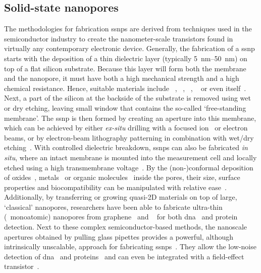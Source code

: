 \subsection{Solid-state nanopores}
%

The methodologies for fabrication \glspl{ssnp} are derived from techniques used in the semiconductor industry
to create the nanometer-scale transistors found in virtually any contemporary electronic device. Generally,
the fabrication of a \gls{ssnp} starts with the deposition of a thin dielectric layer (typically
\SIrange{5}{50}{\nm}) on top of a flat silicon substrate. Because this layer will form both the membrane and
the nanopore, it must have both a high mechanical strength and a high chemical resistance. Hence, suitable
materials include ~\cite{Li-2001,Storm-2003}, ~\cite{Storm-2005},
~\cite{Venkatesan-2009}, ~\cite{Larkin-2013} or even 
itself~\cite{Malachowski-2013}. Next, a part of the silicon at the backside of the substrate is removed using
wet or dry etching, leaving small window that contains the so-called `free-standing membrane'. The \gls{ssnp}
is then formed by creating an aperture into this membrane, which can be achieved by either \textit{ex-situ}
drilling with a focused ion~\cite{Li-2001} or electron~\cite{Storm-2003} beams, or by electron-beam
lithography patterning in combination with wet/dry etching~\cite{Nam-2009}. With controlled dielectric
breakdown, \glspl{ssnp} can also be fabricated \textit{in situ}, where an intact membrane is mounted into the
measurement cell and locally etched using a high transmembrane voltage~\cite{Kwok-2014}. By the
(non-)conformal deposition of oxides~\cite{Chen-2004}, metals~\cite{Li-2013d,Auger-2014,Spitzberg-2019} or
organic molecules~\cite{Wanunu-2007,Yusko-2011,Wei-2012,Rotem-2012} inside the pores, their size, surface
properties and biocompatibility can be manipulated with relative ease~\cite{Eggenberger-2019}. Additionally,
by transferring or growing quasi-2D materials on top of large, `classical' nanopores, researchers have been
able to fabricate ultra-thin (\ie~monoatomic) nanopores from graphene~\cite{Fischbein-2008} and
~\cite{Feng-2015b} for both \gls{dna}~\cite{Feng-2015,Merchant-2010,Song-2011} and
protein~\cite{Shan-2013} detection. Next to these complex semiconductor-based methods, the nanoscale apertures
obtained by pulling glass pipettes provides a powerful, although intrinsically unscalable, approach for
fabricating \glspl{ssnp}~\cite{Wang-2006}. They allow the low-noise detection of
\gls{dna}~\cite{Steinbock-2013} and proteins~\cite{Li-2013B} and can even be integrated with a field-effect
transistor~\cite{Ren-2020}.


